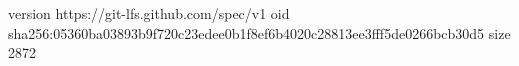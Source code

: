version https://git-lfs.github.com/spec/v1
oid sha256:05360ba03893b9f720c23edee0b1f8ef6b4020c28813ee3fff5de0266bcb30d5
size 2872

